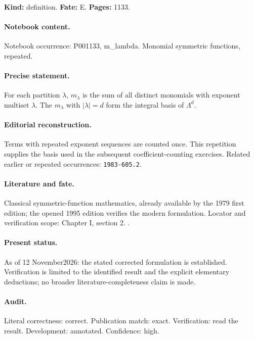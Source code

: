 \noindent\textbf{Kind:} definition. \textbf{Fate:} E. \textbf{Pages:} 1133.\par

\paragraph{Notebook content.} Notebook occurrence: P001133, m_lambda. Monomial symmetric functions, repeated.

\paragraph{Precise statement.} For each partition \(\lambda\), \(m_\lambda\) is the sum of all distinct monomials with exponent multiset \(\lambda\). The \(m_\lambda\) with \(|\lambda|=d\) form the integral basis of \(\Lambda^d\).

\paragraph{Editorial reconstruction.} Terms with repeated exponent sequences are counted once. This repetition supplies the basis used in the subsequent coefficient-counting exercises. Related earlier or repeated occurrences: \texttt{1983-605.2}.

\paragraph{Literature and fate.} Classical symmetric-function mathematics, already available by the 1979 first edition; the opened 1995 edition verifies the modern formulation. Locator and verification scope: Chapter I, section 2. \cite{macdonald1995symmetric}.

\paragraph{Present status.} As of 12 November2026: the stated corrected formulation is established. Verification is limited to the identified result and the explicit elementary deductions; no broader literature-completeness claim is made.

\paragraph{Audit.} Literal correctness: correct. Publication match: exact. Verification: read the result. Development: annotated. Confidence: high.

